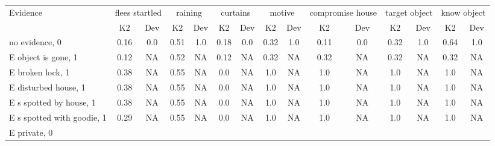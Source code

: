 \begin{table}\begin{tabular}{l|cc|cc|cc|cc|cc|cc|cc}\toprule\multirow{2}{*}{Evidence} & \multicolumn{2}{c}{flees startled}& \multicolumn{2}{c}{raining}& \multicolumn{2}{c}{curtains}& \multicolumn{2}{c}{motive}& \multicolumn{2}{c}{compromise house}& \multicolumn{2}{c}{target object}& \multicolumn{2}{c}{know object}\\& {K2} & {Dev}& {K2} & {Dev}& {K2} & {Dev}& {K2} & {Dev}& {K2} & {Dev}& {K2} & {Dev}& {K2} & {Dev}\\\midrule
no evidence, 0 & \cellcolor{Bittersweet}0.16&\cellcolor{Bittersweet}0.0&\cellcolor{Bittersweet}0.51&\cellcolor{Bittersweet}1.0&\cellcolor{Bittersweet}0.18&\cellcolor{Bittersweet}0.0&\cellcolor{Bittersweet}0.32&\cellcolor{Bittersweet}1.0&\cellcolor{Bittersweet}0.11&\cellcolor{Bittersweet}0.0&\cellcolor{Bittersweet}0.32&\cellcolor{Bittersweet}1.0&\cellcolor{Bittersweet}0.64&\cellcolor{Bittersweet}1.0\\E object is gone, 1 & \cellcolor{Bittersweet}0.12&\cellcolor{Bittersweet}NA&\cellcolor{Bittersweet}0.52&\cellcolor{Bittersweet}NA&\cellcolor{Bittersweet}0.12&\cellcolor{Bittersweet}NA&\cellcolor{Bittersweet}0.32&\cellcolor{Bittersweet}NA&\cellcolor{Bittersweet}0.32&\cellcolor{Bittersweet}NA&\cellcolor{Bittersweet}0.32&\cellcolor{Bittersweet}NA&\cellcolor{Bittersweet}0.32&\cellcolor{Bittersweet}NA\\E broken lock, 1 & \cellcolor{Bittersweet}0.38&\cellcolor{Bittersweet}NA&\cellcolor{Bittersweet}0.55&\cellcolor{Bittersweet}NA&\cellcolor{Bittersweet}0.0&\cellcolor{Bittersweet}NA&\cellcolor{Bittersweet}1.0&\cellcolor{Bittersweet}NA&\cellcolor{Bittersweet}1.0&\cellcolor{Bittersweet}NA&\cellcolor{Bittersweet}1.0&\cellcolor{Bittersweet}NA&\cellcolor{Bittersweet}1.0&\cellcolor{Bittersweet}NA\\E disturbed house, 1 & \cellcolor{Bittersweet}0.38&\cellcolor{Bittersweet}NA&\cellcolor{Bittersweet}0.55&\cellcolor{Bittersweet}NA&\cellcolor{Bittersweet}0.0&\cellcolor{Bittersweet}NA&\cellcolor{Bittersweet}1.0&\cellcolor{Bittersweet}NA&\cellcolor{Bittersweet}1.0&\cellcolor{Bittersweet}NA&\cellcolor{Bittersweet}1.0&\cellcolor{Bittersweet}NA&\cellcolor{Bittersweet}1.0&\cellcolor{Bittersweet}NA\\E s spotted by house, 1 & \cellcolor{Bittersweet}0.38&\cellcolor{Bittersweet}NA&\cellcolor{Bittersweet}0.55&\cellcolor{Bittersweet}NA&\cellcolor{Bittersweet}0.0&\cellcolor{Bittersweet}NA&\cellcolor{Bittersweet}1.0&\cellcolor{Bittersweet}NA&\cellcolor{Bittersweet}1.0&\cellcolor{Bittersweet}NA&\cellcolor{Bittersweet}1.0&\cellcolor{Bittersweet}NA&\cellcolor{Bittersweet}1.0&\cellcolor{Bittersweet}NA\\E s spotted with goodie, 1 & \cellcolor{Bittersweet}0.29&\cellcolor{Bittersweet}NA&\cellcolor{Bittersweet}0.55&\cellcolor{Bittersweet}NA&\cellcolor{Bittersweet}0.0&\cellcolor{Bittersweet}NA&\cellcolor{Bittersweet}1.0&\cellcolor{Bittersweet}NA&\cellcolor{Bittersweet}1.0&\cellcolor{Bittersweet}NA&\cellcolor{Bittersweet}1.0&\cellcolor{Bittersweet}NA&\cellcolor{Bittersweet}1.0&\cellcolor{Bittersweet}NA\\E private, 0 & 
\end{tabular}
\end{table}
